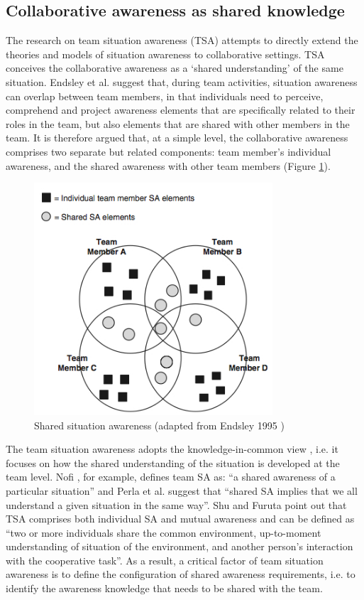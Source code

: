 \subsection{Collaborative awareness as shared knowledge} %
\label{sub:team_situation_awareness}
The research on team situation awareness (TSA) attempts to directly extend the theories and models of situation awareness to collaborative settings. TSA conceives the collaborative awareness as a `shared understanding' of the same situation. Endsley et al. \cite{endsley2001model} suggest that, during team activities, situation awareness can overlap between team members, in that individuals need to perceive, comprehend and project awareness elements that are specifically related to their roles in the team, but also elements that are shared with other members in the team. It is therefore argued that, at a simple level, the collaborative awareness comprises two separate but related components: team member's individual awareness, and the shared awareness with other team members (Figure \ref{fig:tsa}). 

\begin{figure}[htbp] %
   \centering
   \includegraphics[width=3.5in]{TSA.jpg} 
   \caption{Shared situation awareness (adapted from Endsley 1995 \cite{Endsley1995})}
   \label{fig:tsa}
\end{figure}

The team situation awareness adopts the knowledge-in-common view \cite{Mohammed2001}, i.e. it focuses on how the shared understanding of the situation is developed at the team level. Nofi \cite{nofi2000defining}, for example, defines team SA as: ``a shared awareness of a particular situation'' and Perla et al. \cite{perla2000gaming} suggest that ``shared SA implies that we all understand a given situation in the same way''. Shu and Furuta \cite{shu2005inference} point out that TSA comprises both individual SA and mutual awareness and can be defined as ``two or more individuals share the common environment, up-to-moment understanding of situation of the environment, and another person's interaction with the cooperative task''. As a result, a critical factor of team situation awareness is to define the configuration of shared awareness requirements, i.e. to identify the awareness knowledge that needs to be shared with the team.


